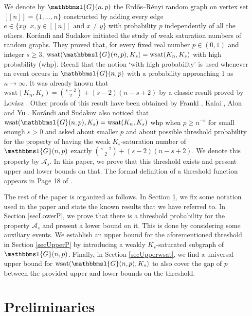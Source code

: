 \documentclass[hidelinks, 11pt]{article}
\theoremstyle{plain}
\theoremstyle{definition}
\begin{document}
We denote by $\mathbbmsl{G}(n,p)$  the Erd\H{o}s--R\'{e}nyi  random graph on vertex set $[\![n]\!]=\{1,\ldots,n\}$ constructed by adding every edge $e\in\{xy \, | \, x, y\in [\![n]\!] \text{ and }  x\neq y\}$
with probability    $p$  independently of all the others. Kor\'{a}ndi and   Sudakov    \cite{kor}  initiated  the study of  weak saturation numbers of random graphs. They   proved that, for every fixed real number  $p\in(0, 1)$ and integer  $s\geq 3$, $\mathrm{wsat}(\mathbbmsl{G}(n, p), K_s)=\mathrm{wsat}(K_n, K_s)$ with high probability (whp). Recall that the  notion `with high probability' is used whenever   an event  occurs in     $\mathbbmsl{G}(n,p)$  with a  probability approaching $1$ as $n\to\infty$. It was already known that    $\mathrm{wsat}(K_n, K_s)={s-2 \choose 2}+(s-2)(n-s+2)$ by a classic result proved by Lov\'{a}sz \cite{L77}.
Other proofs of this result have been obtained by Frankl \cite{Frankl82}, Kalai \cite{Kalai84, Kalai85}, Alon \cite{Alon85}  and Yu \cite{Yu93}.
Kor\'{a}ndi and Sudakov    \cite{kor} also     noticed that  $\mathrm{wsat}(\mathbbmsl{G}(n, p), K_s)=\mathrm{wsat}(K_n, K_s)$ whp when $p\geq n^{-\varepsilon}$ for small
enough $\varepsilon> 0$ and asked about smaller $p$ and about possible  threshold probability for the
property of having the weak $K_s$-saturation number of $\mathbbmsl{G}(n,p)$  exactly ${s-2 \choose 2}+(s-2)(n-s+2)$.    We denote this property   by $\mathcal{A}_s$.
In this paper, we prove that this threshold exists and present  upper and lower  bounds on that. The formal   definition of  a    threshold function      appears  in Page 18 of    \cite{RG}.


The rest of the paper is organized as follows. In Section \ref{prelim}, we fix some  notation     used in the paper and state  the known results   that we have referred to. In Section \ref{secLowerP},  we prove that there is a threshold probability  for the property   $\mathcal{A}_s$ and present a lower
bound on it. This is done by considering  some  auxiliary events. We establish an upper bound for the aforementioned threshold in Section \ref{secUpperP} by introducing a weakly $K_s$-saturated subgraph of $\mathbbmsl{G}(n,p)$. Finally, in Section \ref{secUpperwsat}, we find a universal upper bound for $\mathrm{wsat}(\mathbbmsl{G}(n, p), K_s)$ to also cover the gap of $p$ between the provided upper and lower bounds on the threshold.



\section{Preliminaries}\label{prelim}
\end{document}
